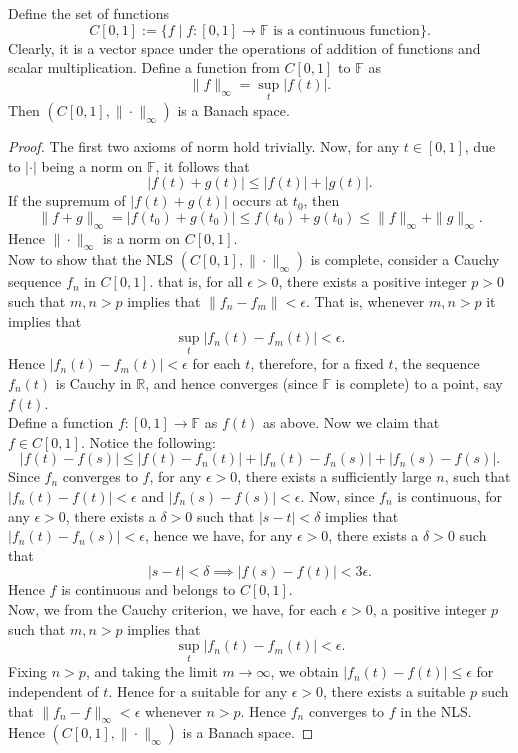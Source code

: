 \begin{eg}
    Define the set of functions $$C[0,1]:=\{f\mid f:[0,1]\to \mathbb{F}\text{ is a continuous function}\}.$$ Clearly, it is a vector space under the operations of addition of functions and scalar multiplication. Define a function from $C[0,1]$ to $\mathbb{F}$ as $$\|f\|_{\infty}=\sup_{t}|f(t)|.$$
    Then $(C[0,1],\|\cdot\|_{\infty})$ is a Banach space.
\end{eg}
\begin{proof}
    The first two axioms of norm hold trivially. Now, for any $t\in [0,1]$, due to $|\cdot|$ being a norm on $\mathbb{F}$, it follows that $$|f(t)+g(t)|\leq |f(t)|+|g(t)|.$$
    If the supremum of $|f(t)+g(t)|$ occurs at $t_{0}$, then $$\|f+g\|_{\infty}=|f(t_{0})+g(t_{0})|\leq f(t_{0})+g(t_{0})\leq\|f\|_{\infty}+\|g\|_{\infty}.$$
    Hence $\|\cdot\|_{\infty}$ is a norm on $C[0,1]$.\\ 
    Now to show that the NLS $(C[0,1],\|\cdot\|_{\infty})$ is complete, consider a Cauchy sequence $f_{n}$ in $C[0,1]$. that is, for all $\epsilon>0$, there exists a positive integer $p>0$ such that $m,n>p$ implies that $\|f_{n}-f_{m}\|<\epsilon$. That is, whenever $m,n>p$ it implies that $$\sup_{t}|f_{n}(t)-f_{m}(t)|<\epsilon.$$ 
    Hence $|f_{n}(t)-f_{m}(t)|<\epsilon$ for each $t$, therefore, for a fixed $t$, the sequence $f_{n}(t)$ is Cauchy in $\mathbb{R}$, and hence converges (since $\mathbb{F}$ is complete) to a point, say $f(t)$.\\ 
    Define a function $f:[0,1]\to \mathbb{F}$ as $f(t)$ as above. Now we claim that $f\in C[0,1]$. Notice the following: $$|f(t)-f(s)|\leq |f(t)-f_{n}(t)|+|f_{n}(t)-f_{n}(s)|+|f_{n}(s)-f(s)|.$$
    Since $f_{n}$ converges to $f$, for any $\epsilon>0$, there exists a sufficiently large $n$, such that $|f_{n}(t)-f(t)|<\epsilon$ and $|f_{n}(s)-f(s)|<\epsilon$. Now, since $f_{n}$ is continuous, for any $\epsilon>0$, there exists a $\delta>0$ such that $|s-t|<\delta$ implies that $|f_{n}(t)-f_{n}(s)|<\epsilon$, hence we have, for any $\epsilon>0$, there exists a $\delta>0$ such that $$|s-t|<\delta\implies|f(s)-f(t)|<3\epsilon.$$
    Hence $f$ is continuous and belongs to $C[0,1]$.\\ 
    Now, we from the Cauchy criterion, we have, for each $\epsilon>0$, a positive integer $p$ such that $m,n>p$ implies that $$\sup_{t}|f_{n}(t)-f_{m}(t)|<\epsilon.$$
    Fixing $n>p$, and taking the limit $m\to\infty$, we obtain $|f_{n}(t)-f(t)|\leq\epsilon$ for independent of $t$. Hence for a suitable for any $\epsilon>0$, there exists a suitable $p$ such that $\|f_{n}-f\|_{\infty}<\epsilon$ whenever $n>p$. Hence $f_{n}$ converges to $f$ in the NLS.\\
    Hence $(C[0,1],\|\cdot\|_{\infty})$ is a Banach space.
\end{proof}
